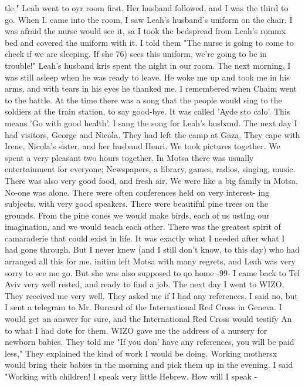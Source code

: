 {{tle." Leah went to oyr room first. Her husband followed, and I was the third to go. 
When I. came into the room, I saw Leah's husband's uniform on the chair. I was afraid the 
nurse would see it, sa I took the bedspread from Leah's rommx bed and covered the uniform 
with it. I told them "The nurse is going to come to check if we are sleeping. If she 
76) 
sees this uniform, we're going to be in trouble!" 
Leah's husband kris spent the night in our room. The next morning, I was still asleep 
when he was ready to leave. He woke me up and took me in his arms, and with tears in his 
eyes he thanked me. I remembered when Chaim went to the battle. At the time there was 
a song that the people would sing to the soldiers at the train station, to say good-bye. 
It was called 'Ayde sto calo'. This means 'Go with good health'. I sang the song for 
Leah's husband. 
The next day I had visitors, George and Nicola. They had left the camp at Gaza. They 
cape with Irene, Nicola's sister, and her husband Henri. We took pictures together. We 
spent a very pleasant two hours together. 
In Motsa there was usually entertainment for everyone; Newspapers, a library, games, 
radios, singing, music. There was also very good food, and fresh air. We were like a big 
family in Motsa. No-one was alone. There were often conferences held on very interest-
ing subjects, with very good speakers. There were beautiful pine trees on the grounds. 
From the pine cones we would make birds, each of us ustIng our imagination, and we would 
teach each other. There was the greatest spirit of camaraderie that could exist in life. 
It was exactly what I needed after what I had gone through. But I never knew (and I still 
don't know, to this day) who had arranged all this for me. 
initim left Motsa with many regrets, and Leah was very sorry to see me go. But she 
was also supposed to qo home 
-99- 
I came back to Tel Aviv very well rested, and ready to find a job. The next day I 
went to WIZO. They received me very well. They asked me if I had any references. I 
said no, but I sent a telegram to Mr. Burcard of the International Red Cross in Geneva. 
I would get an answer for sure, and the International Red Cross would testify An to what 
I had dote for them. 
WIZO gave me the address of a nursery for newborn babies. They told me "If you don' 
have any references, you will be paid less," They explained the kind of work I would be 
doing. Working mothersx would bring their babies in the morning and pick them up in the 
evening. I said "Working with children! I speak very little Hebrew. How will I speak - 
}}
